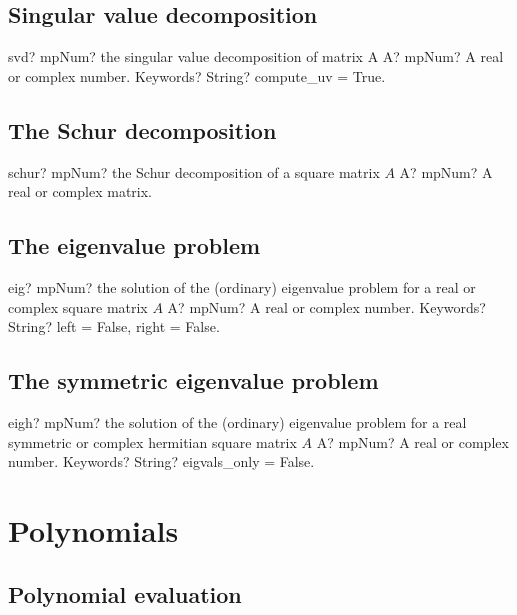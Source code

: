 \documentclass[12pt,a4paper,openany]{book}
\begin{document}
\section{Singular value decomposition}

\begin{mpFunctionsExtract}
\mpFunctionTwo
{svd? mpNum? the singular value decomposition of matrix A}
{A? mpNum? A real or complex number.}
{Keywords? String? compute\_uv = True.}
\end{mpFunctionsExtract}

\section{The Schur decomposition}

\begin{mpFunctionsExtract}
\mpFunctionOne
{schur? mpNum? the Schur decomposition of a square matrix $A$}
{A? mpNum? A real or complex matrix.}
\end{mpFunctionsExtract}

\section{The eigenvalue problem}

\begin{mpFunctionsExtract}
\mpFunctionTwo
{eig? mpNum? the solution of the (ordinary) eigenvalue problem for a real or complex square matrix $A$}
{A? mpNum? A real or complex number.}
{Keywords? String? left = False, right = False.}
\end{mpFunctionsExtract}

\section{The symmetric eigenvalue problem}

\begin{mpFunctionsExtract}
\mpFunctionTwo
{eigh? mpNum? the solution of the (ordinary) eigenvalue problem for a real symmetric or complex hermitian square matrix $A$}
{A? mpNum? A real or complex number.}
{Keywords? String? eigvals\_only = False.}
\end{mpFunctionsExtract}

\chapter{Polynomials}

\section{Polynomial evaluation}
\end{document}
